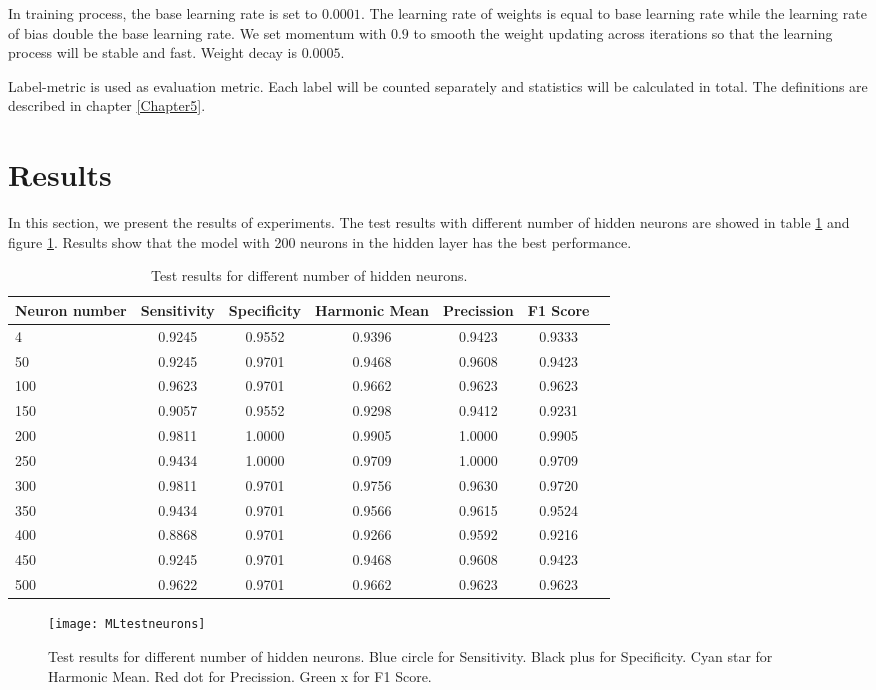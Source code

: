 In training process, the base learning rate is set to $0.0001$. The learning rate of weights is equal to base learning rate while the learning rate of bias double the base learning rate. We set momentum with $0.9$ to smooth the weight updating across iterations so that the learning process will be stable and fast. Weight decay is $0.0005$.

Label-metric is used as evaluation metric. Each label will be counted separately and statistics will be calculated in total. The definitions are described in chapter \ref{Chapter5}.

\section{Results}

In this section, we present the results of experiments. The test results with different number of hidden neurons are showed in table \ref{tb:tMLtestneurons} and figure \ref{fig:MLtestneurons}. Results show that the model with 200 neurons in the hidden layer has the best performance.
\begin{table}
\centering
\begin{tabular}{l*{6}{c}}
Neuron number              & Sensitivity & Specificity & Harmonic Mean & Precission & F1 Score  \\
\hline
4 				& 0.9245 & 0.9552 & 0.9396 & 0.9423 & 0.9333   \\
50              & 0.9245 & 0.9701 & 0.9468 & 0.9608 & 0.9423   \\
100             & 0.9623 & 0.9701 & 0.9662 & 0.9623 &  0.9623  \\
150             & 0.9057 & 0.9552 & 0.9298 & 0.9412 &  0.9231   \\
200             & 0.9811 & 1.0000 & 0.9905 & 1.0000 &  0.9905   \\
250             & 0.9434 & 1.0000 & 0.9709 & 1.0000 &  0.9709   \\
300             & 0.9811 & 0.9701 & 0.9756 & 0.9630 &  0.9720   \\
350             & 0.9434 & 0.9701 & 0.9566 & 0.9615 &  0.9524   \\
400             & 0.8868 & 0.9701 & 0.9266 & 0.9592 &  0.9216   \\
450             & 0.9245 & 0.9701 & 0.9468 & 0.9608 &  0.9423   \\
500             & 0.9622 & 0.9701 & 0.9662 & 0.9623 &  0.9623   \\
\end{tabular}
\caption{\label{tb:tMLtestneurons}Test results for different number of hidden neurons.}
\end{table}
\begin{figure}[htb]
\centering
\texttt{[image: MLtestneurons]}
\caption{\label{fig:MLtestneurons}Test results for different number of hidden neurons. Blue circle for Sensitivity. Black plus for Specificity. Cyan star for Harmonic Mean. Red dot for Precission. Green x for  F1 Score.}
\end{figure}

